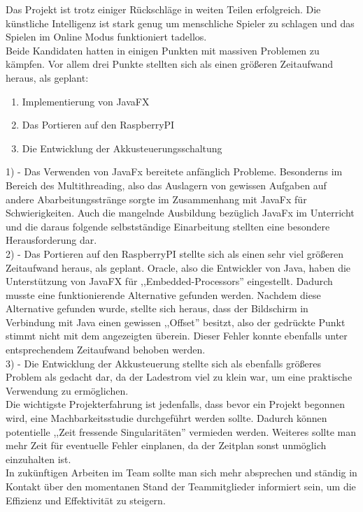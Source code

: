 \documentclass[12pt,a4paper]{article}
\begin{document}
 Das Projekt ist trotz einiger Rückschläge in weiten Teilen erfolgreich. Die künstliche Intelligenz ist stark genug um menschliche Spieler zu schlagen und das Spielen im Online Modus funktioniert tadellos. \\
	Beide Kandidaten hatten in einigen Punkten mit massiven Problemen zu kämpfen. Vor allem drei Punkte stellten sich als einen größeren Zeitaufwand heraus, als geplant:
\begin{enumerate}
	\item{Implementierung von JavaFX}
	\item{Das Portieren auf den RaspberryPI}
	\item{Die Entwicklung der Akkusteuerungsschaltung}
\end{enumerate}
1) - Das Verwenden von JavaFx bereitete anfänglich Probleme. Besonderns im Bereich des Multithreading, also das Auslagern von gewissen Aufgaben auf andere Abarbeitungsstränge sorgte im Zusammenhang mit JavaFx für Schwierigkeiten. Auch die mangelnde Ausbildung bezüglich JavaFx im Unterricht und die daraus folgende selbstständige Einarbeitung stellten eine besondere Herausforderung dar.  \\[1ex]
2) - Das Portieren auf den RaspberryPI stellte sich als einen sehr viel größeren Zeitaufwand heraus, als geplant. Oracle, also die Entwickler von Java, haben die Unterstützung von JavaFX für ,,Embedded-Processors'' eingestellt. Dadurch musste eine funktionierende Alternative gefunden werden. Nachdem diese Alternative gefunden wurde, stellte sich heraus, dass der Bildschirm in Verbindung mit Java einen gewissen ,,Offset'' besitzt, also der gedrückte Punkt stimmt nicht mit dem angezeigten überein. Dieser Fehler konnte ebenfalls unter entsprechendem Zeitaufwand behoben werden. \\[1ex]
3) - Die Entwicklung der Akkusteuerung stellte sich als ebenfalls größeres Problem als gedacht dar, da der Ladestrom viel zu klein war, um eine praktische Verwendung zu ermöglichen. \\[2ex]
Die wichtigste Projekterfahrung ist jedenfalls, dass bevor ein Projekt begonnen wird, eine Machbarkeitsstudie durchgeführt werden sollte. Dadurch können potentielle ,,Zeit fressende Singularitäten'' vermieden werden. Weiteres sollte man mehr Zeit für eventuelle Fehler einplanen, da der Zeitplan sonst unmöglich einzuhalten ist. \\
In zukünftigen Arbeiten im Team sollte man sich mehr absprechen und ständig in Kontakt über den momentanen Stand der Teammitglieder informiert sein, um die Effizienz und Effektivität zu steigern.
\end{document}
